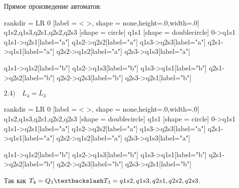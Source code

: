 \documentclass{article}
\begin{document}
 
Прямое произведение автоматов:

\begin{center}
 {
    rankdir = LR
    0 [label = < >, shape = none,height=.0,width=.0]
    q1s2,q1s3,q2s1,q2s2,q2s3 [shape = circle]
    q1s1 [shape = doublecircle]
    0->q1s1
    q1s1->q2s1[label="a"]
    q1s2->q2s2[label="a"]
    q1s3->q2s3[label="a"]
    q2s1->q1s1[label="a"]
    q2s2->q1s2[label="a"]
    q2s3->q1s3[label="a"]
    
    q1s1->q1s2[label="b"]
    q1s2->q1s3[label="b"]
    q1s3->q1s1[label="b"]
    q2s1->q2s2[label="b"]
    q2s2->q2s3[label="b"]
    q2s3->q2s1[label="b"]
}

$2.4) \quad L_4 = \overline L_3$ \newline

 {
    rankdir = LR
    0 [label = < >, shape = none,height=.0,width=.0]
    q1s2,q1s3,q2s1,q2s2,q2s3 [shape = doublecircle]
    q1s1 [shape = circle]
    0->q1s1
    q1s1->q2s1[label="a"]
    q1s2->q2s2[label="a"]
    q1s3->q2s3[label="a"]
    q2s1->q1s1[label="a"]
    q2s2->q1s2[label="a"]
    q2s3->q1s3[label="a"]
    
    q1s1->q1s2[label="b"]
    q1s2->q1s3[label="b"]
    q1s3->q1s1[label="b"]
    q2s1->q2s2[label="b"]
    q2s2->q2s3[label="b"]
    q2s3->q2s1[label="b"]
}
\newline
\end{center}
Так как $T_4=Q_3\textbackslash T_3 = {q1s2,q1s3,q2s1,q2s2,q2s3}$. \\ 
\end{document}

